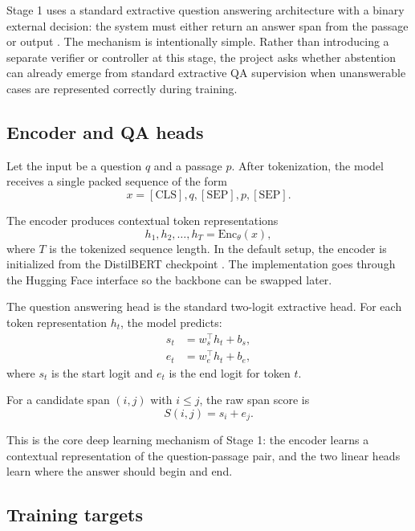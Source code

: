 Stage 1 uses a standard extractive question answering architecture with a
binary external decision:
the system must either return an answer span from the passage or output
\abstain.
The mechanism is intentionally simple.
Rather than introducing a separate verifier or controller at this stage, the
project asks whether abstention can already emerge from standard extractive QA
supervision when unanswerable cases are represented correctly during training.

\subsection{Encoder and QA heads}

Let the input be a question $q$ and a passage $p$.
After tokenization, the model receives a single packed sequence of the form
\begin{equation}
  x = [\mathrm{CLS}], q, [\mathrm{SEP}], p, [\mathrm{SEP}].
\end{equation}

The encoder produces contextual token representations
\begin{equation}
  h_1, h_2, \dots, h_T = \mathrm{Enc}_{\theta}(x),
\end{equation}
where $T$ is the tokenized sequence length.
In the default setup, the encoder is initialized from the DistilBERT checkpoint
\modelname.
The implementation goes through the Hugging Face \autoqaclass{} interface so
the backbone can be swapped later.

The question answering head is the standard two-logit extractive head.
For each token representation $h_t$, the model predicts:
\begin{align}
  s_t &= w_s^\top h_t + b_s, \\
  e_t &= w_e^\top h_t + b_e,
\end{align}
where $s_t$ is the start logit and $e_t$ is the end logit for token $t$.

For a candidate span $(i, j)$ with $i \leq j$, the raw span score is
\begin{equation}
  S(i, j) = s_i + e_j.
\end{equation}

This is the core deep learning mechanism of Stage 1:
the encoder learns a contextual representation of the question-passage pair,
and the two linear heads learn where the answer should begin and end.

\subsection{Training targets}

